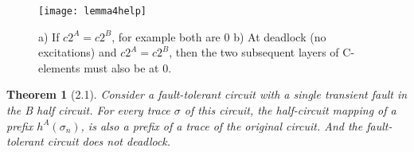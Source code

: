 \documentclass[12pt]{report}
\newtheorem*{theorem}{Theorem}
\newtheorem*{corollary}{Corollary}
\begin{document}
\begin{figure}
  \centering
    \texttt{[image: lemma4help]}
  \caption{a) If $c2^A=c2^B$, for example both are 0  b) At deadlock (no excitations) and $c2^A=c2^B$, then the two subsequent layers of C-elements must also be at 0. }
  \label{fig:t2}
\end{figure}


\begin{theorem}[2.1]
Consider a fault-tolerant circuit with a single transient fault in the B half circuit.  For every trace $\sigma$ of this circuit, the half-circuit mapping of a prefix $h^{A}(\sigma_n)$, is also a prefix of a trace of the original circuit.  And the fault-tolerant circuit does not deadlock.  
\end{theorem}
\end{document}
